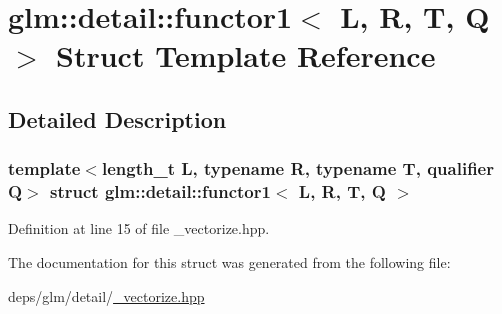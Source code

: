 \hypertarget{structglm_1_1detail_1_1functor1}{}\section{glm\+:\+:detail\+:\+:functor1$<$ L, R, T, Q $>$ Struct Template Reference}
\label{structglm_1_1detail_1_1functor1}


\subsection{Detailed Description}
\subsubsection*{template$<$length\+\_\+t L, typename R, typename T, qualifier Q$>$\newline
struct glm\+::detail\+::functor1$<$ L, R, T, Q $>$}



Definition at line 15 of file \+\_\+vectorize.\+hpp.



The documentation for this struct was generated from the following file\+:\begin{DoxyCompactItemize}
\item 
deps/glm/detail/\hyperlink{__vectorize_8hpp}{\+\_\+vectorize.\+hpp}\end{DoxyCompactItemize}
